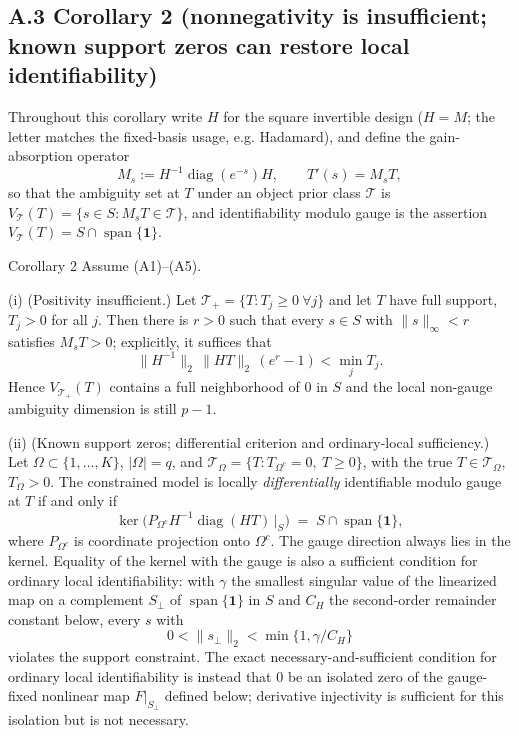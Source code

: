 \subsection{A.3 Corollary 2 (nonnegativity is insufficient; known support zeros can restore local identifiability)}

Throughout this corollary write $H$ for the square invertible design ($H = M$; the letter matches the fixed-basis usage, e.g. Hadamard), and define the gain-absorption operator
\[
M_s := H^{-1}\operatorname{diag}(e^{-s})H, \qquad T'(s) = M_s T,
\]
so that the ambiguity set at $T$ under an object prior class $\mathcal T$ is $V_{\mathcal T}(T) = \{s \in S : M_sT \in \mathcal T\}$, and identifiability modulo gauge is the assertion $V_{\mathcal T}(T) = S \cap \operatorname{span}\{\mathbf 1\}$.

\begin{namedthm}{Corollary 2}
Assume (A1)--(A5).

(i) (Positivity insufficient.) Let $\mathcal T_+ = \{T : T_j \ge 0\ \forall j\}$ and let $T$ have full support, $T_j > 0$ for all $j$. Then there is $r > 0$ such that every $s \in S$ with $\lVert s\rVert_\infty < r$ satisfies $M_sT > 0$; explicitly, it suffices that
\[
\lVert H^{-1}\rVert_{2}\,\lVert HT\rVert_2\,(e^{r} - 1) < \min_j T_j .
\]
Hence $V_{\mathcal T_+}(T)$ contains a full neighborhood of $0$ in $S$ and the local non-gauge ambiguity dimension is still $p - 1$.

(ii) (Known support zeros; differential criterion and ordinary-local sufficiency.) Let $\Omega \subset \{1,\dots,K\}$, $|\Omega| = q$, and $\mathcal T_\Omega = \{T : T_{\Omega^c} = 0,\ T \ge 0\}$, with the true $T \in \mathcal T_\Omega$, $T_\Omega > 0$. The constrained model is locally \emph{differentially} identifiable modulo gauge at $T$ if and only if
\[
\ker\!\big(P_{\Omega^c} H^{-1}\operatorname{diag}(HT)\,\big|_S\big) \;=\; S \cap \operatorname{span}\{\mathbf 1\},
\]
where $P_{\Omega^c}$ is coordinate projection onto $\Omega^c$. The gauge direction always lies in the kernel. Equality of the kernel with the gauge is also a sufficient condition for ordinary local identifiability: with $\gamma$ the smallest singular value of the linearized map on a complement $S_\perp$ of $\operatorname{span}\{\mathbf 1\}$ in $S$ and $C_H$ the second-order remainder constant below, every $s$ with
\[
0<\lVert s_\perp\rVert_2<\min\{1,\gamma/C_H\}
\]
violates the support constraint. The exact necessary-and-sufficient condition for ordinary local identifiability is instead that $0$ be an isolated zero of the gauge-fixed nonlinear map $F|_{S_\perp}$ defined below; derivative injectivity is sufficient for this isolation but is not necessary.


\end{namedthm}
